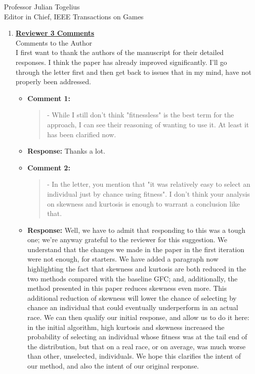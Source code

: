 \documentclass[10pt]{letter} %
\begin{document}
\begin{letter}{Professor Julian Togelius \\ Editor in Chief, IEEE Transactions on Games}
\begin{enumerate}
\newpage

%
\item {\bf \underline{ Reviewer 3 Comments}}\\
		Comments to the Author\\
		I first want to thank the authors of the manuscript for their detailed responses. I think the paper has already improved significantly. I'll go through the letter first and then get back to issues that in my mind, have not properly been addressed.	
		\begin{itemize}
			\item {\bf Comment 1:}
				\begin{quote}	
					- While I still don't think "fitnessless" is the best term for the approach, I can see their reasoning of wanting to use it. At least it has been clarified now.
				\end{quote}	
			\item {\bf Response:} 
                          Thanks a lot.
			\item {\bf Comment 2:}
				\begin{quote}	
					- In the letter, you mention that "it was relatively easy to select an individual just by chance using fitness". I don't think your analysis on skewness and kurtosis is enough to warrant a conclusion like that.
				\end{quote}	
			\item {\bf Response:} 
Well, we have to admit that responding to this was a tough one; we're
anyway grateful to the reviewer for this suggestion. We understand
that the changes we made in the paper in the first iteration were not
enough, for starters. We have added a paragraph now highlighting the
fact that skewness and kurtosis are both reduced in the two methods
compared with the baseline  {\sf GFC}; and, additionally, the method
presented in this paper reduces skewness even more. This additional
reduction of skewness will lower the chance of selecting by chance an
individual that could eventually underperform in an actual race. We
can then qualify our initial response, and allow us to do it here: in
the initial algorithm, high kurtosis and skewness increased the
probability of selecting an individual whose fitness was at the tail
end of the distribution, but that on a real race, or on average, was
much worse than other, unselected, individuals. We hope this clarifies
the intent of our method, and also the intent of our original response.

\end{itemize}
\end{enumerate}
\end{letter}
\end{document}
